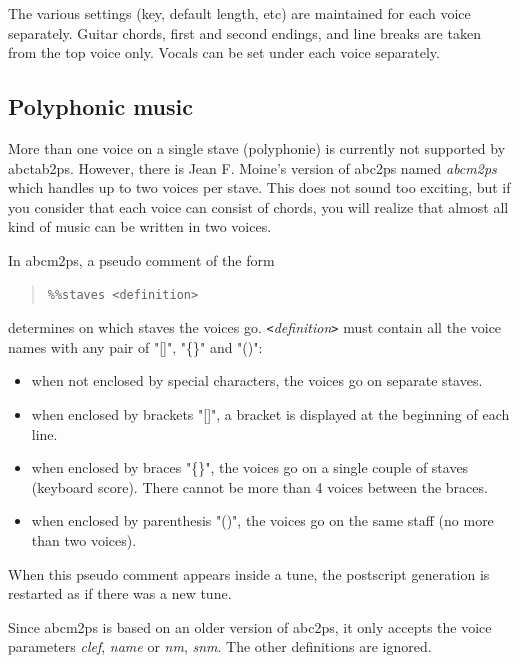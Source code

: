 \documentclass[a4paper]{article}
\begin{document}
The various settings (key, default length, etc) are 
maintained for each voice separately.
Guitar chords, first and second endings, and line breaks are 
taken from the top voice only. Vocals can be set under each
voice separately.

\subsection{Polyphonic music}
\label{sec:PolyphonicMusic}
 
More than one voice on a single stave (polyphonie) is
currently not supported by abctab2ps. However, there is Jean F. Moine's
version of abc2ps named {\it abcm2ps} which handles up to two voices
per stave. This does not sound too exciting, but if you consider that 
each voice can consist of chords, you will realize that almost all 
kind of music can be written in two voices.
\par
In abcm2ps, a pseudo comment of the form
\begin{quote}
\begin{verbatim}
%%staves <definition>
\end{verbatim}
\end{quote}
determines on which staves the voices go. 
{\it \verb$<$definition\verb$>$ } must contain all the voice names with any
pair of "[]", "\{\}" and "()":
\begin{itemize}
\item when not enclosed by special characters, the voices go on separate
  staves.
\item when enclosed by brackets "[]", a bracket is displayed at the 
  beginning of each line.
\item when enclosed by braces "\{\}", the voices go on a single couple 
  of staves (keyboard score). There cannot be more than 4 voices between 
  the braces.
\item when enclosed by parenthesis "()", the voices go on the same staff (no
  more than two voices).
\end{itemize}
When this pseudo comment appears inside a tune, the postscript generation
is restarted as if there was a new tune.
\par
Since abcm2ps is based on an older version of abc2ps, it only accepts
the voice parameters {\it clef}, {\it name} or {\it nm}, {\it snm}.
The other definitions are ignored.

\end{document}

